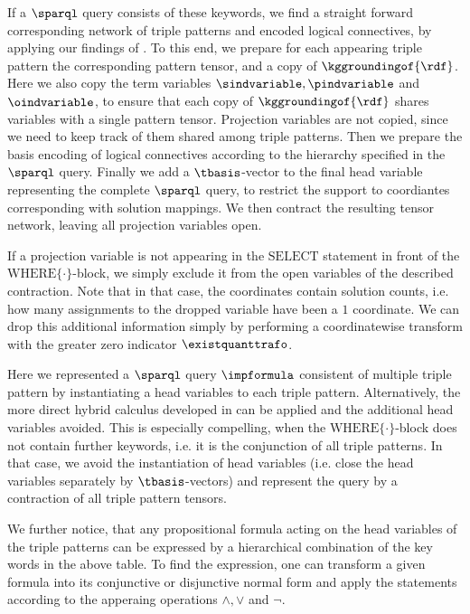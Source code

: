 If a $\sparql$ query consists of these keywords, we find a straight forward corresponding network of triple patterns and encoded logical connectives, by applying our findings of .
To this end, we prepare for each appearing triple pattern the corresponding pattern tensor, and a copy of $\kggroundingof{\rdf}$.
Here we also copy the term variables $\sindvariable,\pindvariable$ and $\oindvariable$, to ensure that each copy of $\kggroundingof{\rdf}$ shares variables with a single pattern tensor.
Projection variables are not copied, since we need to keep track of them shared among triple patterns.
Then we prepare the basis encoding of logical connectives according to the hierarchy specified in the $\sparql$ query.
Finally we add a $\tbasis$-vector to the final head variable representing the complete $\sparql$ query, to restrict the support to coordiantes corresponding with solution mappings.
We then contract the resulting tensor network, leaving all projection variables open.

If a projection variable is not appearing in the $\mathrm{SELECT}$ statement in front of the $\mathrm{WHERE}\{\cdot\}$-block, we simply exclude it from the open variables of the described contraction.
Note that in that case, the coordinates contain solution counts, i.e. how many assignments to the dropped variable have been a $1$ coordinate.
We can drop this additional information simply by performing a coordinatewise transform with the greater zero indicator $\existquanttrafo$.

Here we represented a $\sparql$ query $\impformula$ consistent of multiple triple pattern by instantiating a head variables to each triple pattern.
Alternatively, the more direct hybrid calculus developed in  can be applied and the additional head variables avoided.
This is especially compelling, when the $\mathrm{WHERE}\{\cdot\}$-block does not contain further keywords, i.e. it is the conjunction of all triple patterns.
In that case, we avoid the instantiation of head variables (i.e. close the head variables separately by $\tbasis$-vectors) and represent the query by a contraction of all triple pattern tensors.

We further notice, that any propositional formula acting on the head variables of the triple patterns can be expressed by a hierarchical combination of the key words in the above table.
To find the expression, one can transform a given formula into its conjunctive or disjunctive normal form and apply the statements according to the apperaing operations $\land,\lor$ and $\lnot$.



